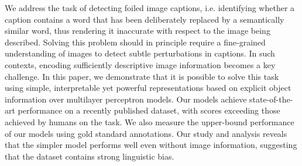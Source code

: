 We address the task of detecting foiled image captions, i.e. identifying whether a caption contains a word that has been deliberately replaced by a semantically similar word, thus rendering it inaccurate with respect to the image being described. Solving this problem should in principle require a fine-grained understanding of images to detect subtle perturbations in captions. In such contexts, encoding sufficiently descriptive image information becomes a key challenge. In this paper, we demonstrate that it is possible to solve this task using simple, interpretable yet powerful representations based on explicit object information over multilayer perceptron models. Our models achieve state-of-the-art performance on a recently published dataset, with scores exceeding those achieved by humans on the task. We also measure the upper-bound performance of our models using gold standard annotations. Our study and analysis reveals that the simpler model performs well even without image information, suggesting that the dataset contains strong linguistic bias.
